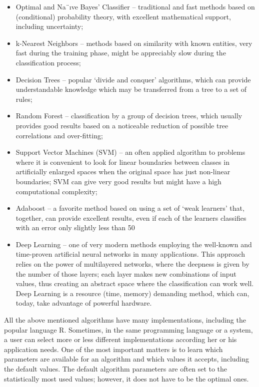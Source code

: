 \begin{itemize}
    \item Optimal and Na¨ıve Bayes’ Classifier – traditional and fast methods based
on (conditional) probability theory, with excellent mathematical support,
including uncertainty;
    \item k-Nearest Neighbors – methods based on similarity with known entities,
very fast during the training phase, might be appreciably slow during the
classification process;
    \item Decision Trees – popular ‘divide and conquer’ algorithms, which can
provide understandable knowledge which may be transferred from a tree
to a set of rules;
    \item Random Forest – classification by a group of decision trees, which usually provides good results based on a noticeable reduction of possible tree
correlations and over-fitting;

    \item Support Vector Machines (SVM) – an often applied algorithm to problems where it is convenient to look for linear boundaries between classes
in artificially enlarged spaces when the original space has just non-linear
boundaries; SVM can give very good results but might have a high computational complexity;

    \item Adaboost – a favorite method based on using a set of ‘weak learners’
that, together, can provide excellent results, even if each of the learners
classifies with an error only slightly less than 50%

    \item Deep Learning – one of very modern methods employing the well-known
and time-proven artificial neural networks in many applications. This approach relies on the power of multilayered networks, where the deepness
is given by the number of those layers; each layer makes new combinations of input values, thus creating an abstract space where the classification can work well. Deep Learning is a resource (time, memory)
demanding method, which can, today, take advantage of powerful hardware.
\end{itemize}

All the above mentioned algorithms have many implementations, including
the popular language R. Sometimes, in the same programming language or a system, a user can select more or less different implementations according her or his
application needs. One of the most important matters is to learn which parameters are available for an algorithm and which values it accepts, including the
default values. The default algorithm parameters are often set to the statistically
most used values; however, it does not have to be the optimal ones.

